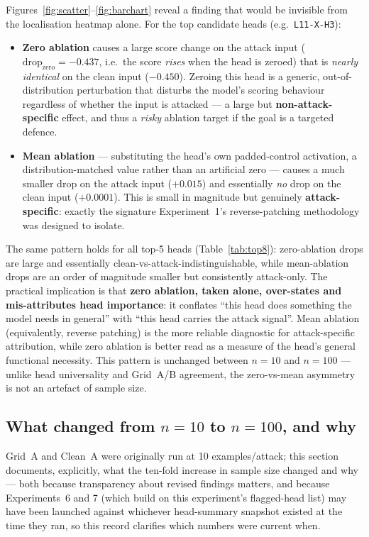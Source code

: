 \documentclass[11pt]{article}
\begin{document}
Figures~\ref{fig:scatter}--\ref{fig:barchart} reveal a finding that would be
invisible from the localisation heatmap alone. For the top candidate heads
(e.g.\ \texttt{L11-X-H3}):
\begin{itemize}[nosep]
  \item \textbf{Zero ablation} causes a large score change on the attack
  input ($\text{drop}_{\text{zero}}=-0.437$, i.e.\ the score \emph{rises}
  when the head is zeroed) that is \emph{nearly identical} on the clean
  input ($-0.450$). Zeroing this head is a generic, out-of-distribution
  perturbation that disturbs the model's scoring behaviour regardless of
  whether the input is attacked — a large but \textbf{non-attack-specific}
  effect, and thus a \emph{risky} ablation target if the goal is a targeted
  defence.
  \item \textbf{Mean ablation} — substituting the head's own
  padded-control activation, a distribution-matched value rather than an
  artificial zero — causes a much smaller drop on the attack input
  ($+0.015$) and essentially \emph{no} drop on the clean input
  ($+0.0001$). This is small in magnitude but genuinely
  \textbf{attack-specific}: exactly the signature Experiment~1's
  reverse-patching methodology was designed to isolate.
\end{itemize}
The same pattern holds for all top-5 heads (Table~\ref{tab:top8}):
zero-ablation drops are large and essentially clean-vs-attack-indistinguishable,
while mean-ablation drops are an order of magnitude smaller but consistently
attack-only. The practical implication is that \textbf{zero ablation, taken
alone, over-states and mis-attributes head importance}: it conflates ``this
head does something the model needs in general'' with ``this head carries
the attack signal''. Mean ablation (equivalently, reverse patching) is the
more reliable diagnostic for attack-specific attribution, while zero
ablation is better read as a measure of the head's general functional
necessity. This pattern is unchanged between $n=10$ and $n=100$ — unlike
head universality and Grid~A/B agreement, the zero-vs-mean asymmetry is not
an artefact of sample size.

\subsection{What changed from $n=10$ to $n=100$, and why}
\label{sec:n100}

Grid~A and Clean~A were originally run at 10 examples/attack; this section
documents, explicitly, what the ten-fold increase in sample size changed
and why — both because transparency about revised findings matters, and
because Experiments~6 and 7 (which build on this experiment's flagged-head
list) may have been launched against whichever head-summary snapshot
existed at the time they ran, so this record clarifies which numbers were
current when.
\end{document}
